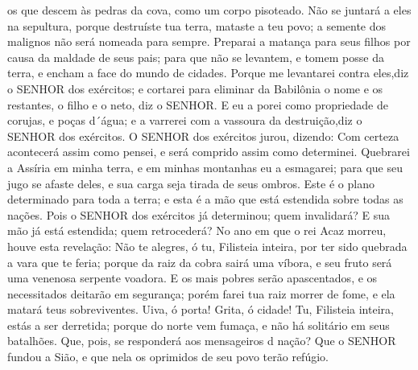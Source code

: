 {{} os que descem às pedras da cova, como um corpo pisoteado.
Não se juntará a eles na sepultura, porque destruíste tua terra,
{} mataste a teu povo; a semente dos malignos não será nomeada para sempre.
Preparai a matança para seus filhos por causa da maldade de seus pais; para que não se levantem, e tomem posse da terra, e encham a face do mundo de cidades.
Porque me levantarei contra eles,diz o SENHOR dos exércitos; e cortarei para eliminar da Babilônia o nome e os restantes, o filho e o neto, diz o SENHOR.
E eu a porei como propriedade de corujas, e poças d´água; e a varrerei com a vassoura da destruição,diz o SENHOR dos exércitos.
O SENHOR dos exércitos jurou, dizendo: Com certeza acontecerá assim como pensei, e será comprido assim como determinei.
Quebrarei a Assíria em minha terra, e em minhas montanhas eu a esmagarei; para que seu jugo se afaste deles, e sua carga seja tirada de seus ombros.
Este é o plano determinado para toda a terra; e esta é a mão que está estendida sobre todas as nações.
Pois o SENHOR dos exércitos já determinou; quem invalidará? E sua mão já está estendida; quem
{} retrocederá?
No ano em que o rei Acaz morreu, houve esta revelação:
Não te alegres, ó tu, Filisteia inteira, por ter sido quebrada a vara que te feria; porque da raiz da cobra sairá uma víbora, e seu fruto será uma venenosa serpente voadora.
E os mais pobres
 serão apascentados, e os necessitados deitarão em segurança; porém farei tua raiz morrer de fome, e ela matará teus sobreviventes.
Uiva, ó porta! Grita, ó cidade! Tu, Filisteia inteira, estás a ser derretida; porque do norte vem fumaça, e não há solitário em seus batalhões.
Que, pois, se responderá aos mensageiros d
{} nação? Que o SENHOR fundou a Sião, e que nela os oprimidos de seu povo terão refúgio.

}
